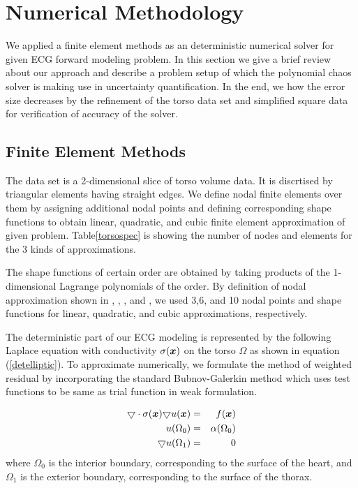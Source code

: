 \section{Numerical Methodology}

We applied a finite element methods as an deterministic numerical
solver for given ECG forward modeling problem. In this section we
give a brief review about our approach and describe a problem
setup of which the polynomial chaos solver is making use in
uncertainty quantification. In the end, we how the error size
decreases by the refinement of the torso data set and simplified
square data for verification of accuracy of the solver.

\subsection{Finite Element Methods}

The data set is a 2-dimensional slice of torso volume data. It is
discrtised by triangular elements having straight edges. We define
nodal finite elements over them by assigning additional nodal
points and defining corresponding shape functions to obtain
linear, quadratic, and cubic finite element approximation of given
problem. Table\ref{torsospec} is showing the number of nodes and
elements for the 3 kinds of approximations.


The shape functions of certain order are obtained by taking
products of the 1-dimensional Lagrange polynomials of the order.
By definition of nodal approximation shown in \cite{Burnett87},
\cite{Hughes87}, \cite{Johnson02}, and \cite{Zienkiewicz00}, we
used 3,6, and 10 nodal points and shape functions for linear,
quadratic, and cubic approximations, respectively.


The deterministic part of our ECG modeling is represented by the
following Laplace equation with conductivity $\sigma(\boldsymbol{x})$ on the
torso $\Omega$ as shown in equation (\ref{detelliptic}). To
approximate numerically, we formulate the method of weighted
residual by incorporating the standard Bubnov-Galerkin method
\cite{Karniadarkis99} which uses test functions to be same as
trial function in weak formulation.

\begin{eqnarray}
\label{detelliptic}
\bigtriangledown \cdot {\sigma( \boldsymbol{x} ) \bigtriangledown}u(\boldsymbol{x}) & = & f(\boldsymbol{x})\\
u(\Omega_{0}) & = & \alpha(\Omega_{0}) \\
\bigtriangledown u(\Omega_{1}) & = & 0
\end{eqnarray}
where $\Omega_{0}$ is the interior boundary, corresponding to the
surface of the heart, and $\Omega_{1}$ is the exterior boundary,
corresponding to the surface of the thorax.


